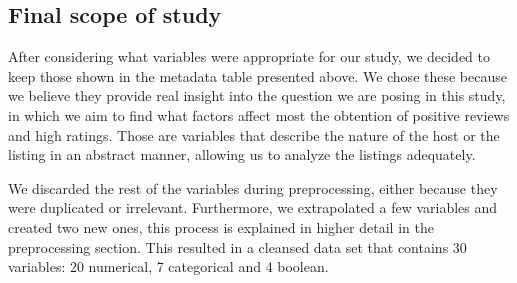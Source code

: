 \subsection{Final scope of study}

After considering what variables were appropriate for our study, we decided to keep 
those shown in the metadata table presented above. We chose these because
we believe they provide real insight into the question we are posing in this study,
in which we aim to find what factors affect most the obtention of positive reviews
and high ratings. Those are variables that describe the nature of the host or
the listing in an abstract manner, allowing us to analyze the listings adequately.

We discarded the rest
of the variables during preprocessing, either because they were duplicated or
irrelevant. Furthermore, we extrapolated a few variables and created 
two new ones, this process is explained in higher detail in the preprocessing 
section. This resulted in a cleansed data set that contains 30 variables: 
20 numerical, 7 categorical and 4 boolean.